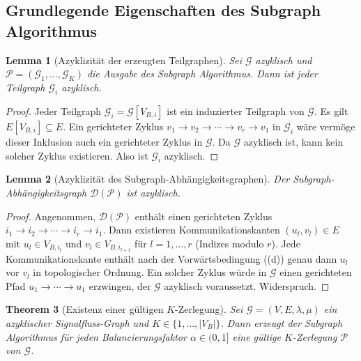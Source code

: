 ﻿\documentclass[12pt,a4paper]{article}
\newtheorem{theorem}{Theorem}[section]
\newtheorem{lemma}[theorem]{Lemma}
\theoremstyle{definition}
\begin{document}
\subsection{Grundlegende Eigenschaften des Subgraph Algorithmus}
\label{subsec:subgraph-props}

\begin{lemma}[Azyklizität der erzeugten Teilgraphen]
\label{lem:acyclic}
Sei $\mathcal{G}$ azyklisch und $\mathcal{P} = (\mathcal{G}_1, \ldots,
\mathcal{G}_K)$ die Ausgabe des Subgraph Algorithmus. Dann ist jeder
Teilgraph $\mathcal{G}_i$ azyklisch.
\end{lemma}

\begin{proof}
Jeder Teilgraph $\mathcal{G}_i = \mathcal{G}[V_{B,i}]$ ist ein induzierter
Teilgraph von $\mathcal{G}$. Es gilt $E[V_{B,i}] \subseteq E$. Ein
gerichteter Zyklus $v_1 \to v_2 \to \cdots \to v_r \to v_1$ in
$\mathcal{G}_i$ wäre vermöge dieser Inklusion auch ein gerichteter Zyklus
in $\mathcal{G}$. Da $\mathcal{G}$ azyklisch ist, kann kein solcher Zyklus
existieren. Also ist $\mathcal{G}_i$ azyklisch.
\end{proof}

\begin{lemma}[Azyklizität des Subgraph-Abhängigkeitsgraphen]
\label{lem:subdep-acyclic}
Der Subgraph-Abhängig\-keitsgraph $\mathcal{D}(\mathcal{P})$ ist azyklisch.
\end{lemma}

\begin{proof}
Angenommen, $\mathcal{D}(\mathcal{P})$ enthält einen gerichteten Zyklus
$i_1 \to i_2 \to \cdots \to i_r \to i_1$. Dann existieren
Kommunikationskanten $(u_l, v_l) \in E$ mit $u_l \in V_{B,i_l}$ und
$v_l \in V_{B,i_{l+1}}$ für $l = 1, \ldots, r$ (Indizes modulo $r$).
Jede Kommunikationskante enthält nach der Vorwärtsbedingung
((d)) genau dann $u_l$ vor $v_l$ in topologischer
Ordnung. Ein solcher Zyklus würde in $\mathcal{G}$ einen gerichteten
Pfad $u_1 \to \cdots \to u_1$ erzwingen, der $\mathcal{G}$ azyklisch
voraussetzt. Widerspruch.
\end{proof}

\begin{theorem}[Existenz einer gültigen $K$-Zerlegung]
\label{thm:existence}
Sei $\mathcal{G} = (V, E, \lambda, \mu)$ ein azyklischer Signalfluss-Graph
und $K \in \{1, \ldots, |V_B|\}$. Dann erzeugt der Subgraph Algorithmus
für jeden Balancierungsfaktor $\alpha \in (0,1]$ eine gültige $K$-Zerlegung
$\mathcal{P}$ von $\mathcal{G}$.
\end{theorem}
\end{document}
